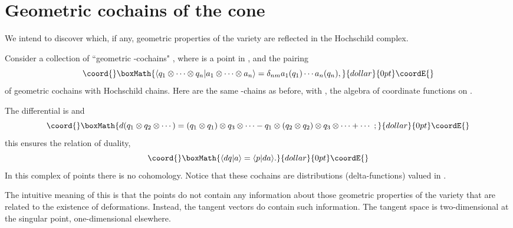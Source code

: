 \documentclass[a4paper,a4paper]{article}
\begin{document}
 
\section{Geometric cochains of the cone \coordHE{}}  %

We intend to discover which, if any, geometric properties of the variety
are reflected in the Hochschild complex.

\bigskip
{} Consider a collection of ``geometric \coordHE{}-cochains"
\coordHE{}, where \coordHE{} is a point in \coordHE{}, and
the pairing
$$\coord{}\boxMath{
\langle q_1\otimes \cdots \otimes q_n|a_1\otimes\cdots \otimes
a_n\rangle = \delta_{nm}a_1(q_1)\cdots a_n(q_n),
}{dollar}{0pt}\coordE{}$$
of geometric cochains with Hochschild chains.  
Here  \coordHE{} are the same \coordHE{}-chains as before, with
\coordHE{}, the algebra of coordinate functions on 
\coordHE{}. 

The  differential is \coordHE{} and
$$\coord{}\boxMath{
d(q_1\otimes q_2\otimes \cdots) = (q_1\otimes q_1) \otimes q_3\otimes 
\cdots - q_1\otimes (q_2\otimes q_2) \otimes q_3\otimes \cdots + \cdots \,\,;
}{dollar}{0pt}\coordE{}$$
this ensures the relation of duality,
$$\coord{}\boxMath{
\langle dq|a\rangle = \langle p|da\rangle.
}{dollar}{0pt}\coordE{}$$
In this complex of points there is no cohomology. Notice that these
cochains are distributions (delta-functions) valued in \coordHE{}.

The intuitive meaning of this is that the points do not contain any
information about those geometric properties of the  variety that
are related to the existence of deformations. Instead, the tangent vectors
do contain such information. The tangent space is two-dimensional at the
singular point, one-dimensional elsewhere.

\bigskip
\end{document}

